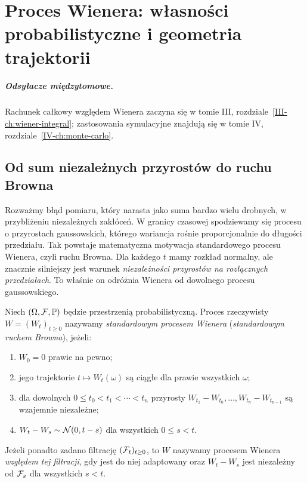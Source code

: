 \chapter{Proces Wienera: własności probabilistyczne i geometria trajektorii}
\label{ch:wiener}
\paragraph{Odsyłacze międzytomowe.} Rachunek całkowy względem Wienera zaczyna się w tomie III, rozdziale~\ref{III-ch:wiener-integral}; zastosowania symulacyjne znajdują się w tomie IV, rozdziale~\ref{IV-ch:monte-carlo}.


\section{Od sum niezależnych przyrostów do ruchu Browna}
Rozważmy błąd pomiaru, który narasta jako suma bardzo wielu drobnych,
w przybliżeniu niezależnych zakłóceń. W granicy czasowej spodziewamy
się procesu o przyrostach gaussowskich, którego wariancja rośnie
proporcjonalnie do długości przedziału. Tak powstaje matematyczna
motywacja standardowego procesu Wienera, czyli ruchu Browna.
Dla każdego $t$ mamy rozkład normalny, ale znacznie silniejszy
jest warunek \emph{niezależności przyrostów na rozłącznych
przedziałach}. To właśnie on odróżnia Wienera od dowolnego
procesu gaussowskiego.

\begin{definicja}
Niech $(\Omega,\mathcal{F},\mathbb{P})$ będzie przestrzenią probabilistyczną.
Proces rzeczywisty $W=(W_t)_{t\ge0}$ nazywamy
\emph{standardowym procesem Wienera} (\emph{standardowym ruchem Browna}),
jeżeli:
\begin{enumerate}
\item $W_0=0$ prawie na pewno;
\item jego trajektorie $t\mapsto W_t(\omega)$ są ciągłe dla prawie
wszystkich $\omega$;
\item dla dowolnych $0\le t_0<t_1<\cdots<t_n$ przyrosty
$W_{t_1}-W_{t_0},\ldots,W_{t_n}-W_{t_{n-1}}$
są wzajemnie niezależne;
\item $W_t-W_s\sim\mathcal{N}(0,t-s)$ dla wszystkich $0\le s<t$.
\end{enumerate}
Jeżeli ponadto zadano filtrację $(\mathcal{F}_t)_{t\ge0}$, to $W$
nazywamy procesem Wienera \emph{względem tej filtracji},
gdy jest do niej adaptowany oraz $W_t-W_s$ jest niezależny
od $\mathcal{F}_s$ dla wszystkich $s<t$.
\end{definicja}

